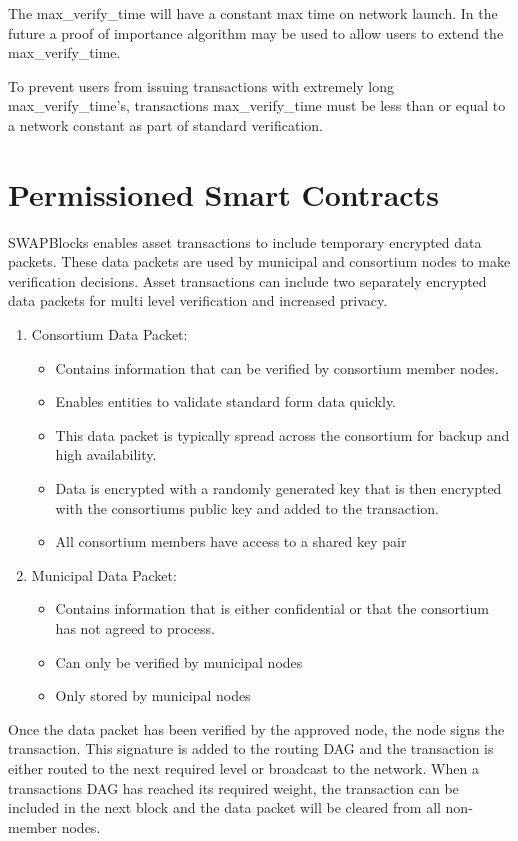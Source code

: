 \documentclass[12pt]{article}
\begin{document}
The max\_verify\_time will have a constant max time on network launch.  
In the future a proof of importance algorithm may be used to 
allow users to extend the max\_verify\_time.

To prevent users from issuing transactions with extremely long max\_verify\_time's, transactions max\_verify\_time
must be less than or equal to a network constant as part of standard verification.

\section{Permissioned Smart Contracts}

SWAPBlocks enables asset transactions to include temporary encrypted data packets. These data
packets are used by municipal and consortium nodes to make verification decisions.  Asset transactions
can include two separately encrypted data packets for multi level verification and increased privacy.

\begin{enumerate}
	\item Consortium Data Packet:
		\begin{itemize}
			\item{Contains information that can be verified by consortium member
				nodes.}
			\item{Enables entities to validate standard form data quickly.} 
			\item{This data packet is typically spread across the consortium for backup
				and high availability.}
			\item{Data is encrypted with a randomly generated key that is then encrypted
				with the consortiums public key and added to the transaction.}
			\item{All consortium members have access to a shared key pair}	
		\end{itemize}
	\item Municipal Data Packet:
		\begin{itemize}
			\item{Contains information that is either confidential or that the
				consortium has not agreed to process.}
			\item{Can only be verified by municipal nodes}
			\item{Only stored by municipal nodes}
		\end{itemize}
\end{enumerate}

Once the data packet has been verified by the approved node, the node signs the 
transaction. This signature is added to the routing DAG and the transaction is either routed
		to the next required level or broadcast to the network.
When a transactions DAG has reached 
its required weight, the transaction can be included in the next block and the data
		packet will be cleared from all non-member nodes.
\end{document}
